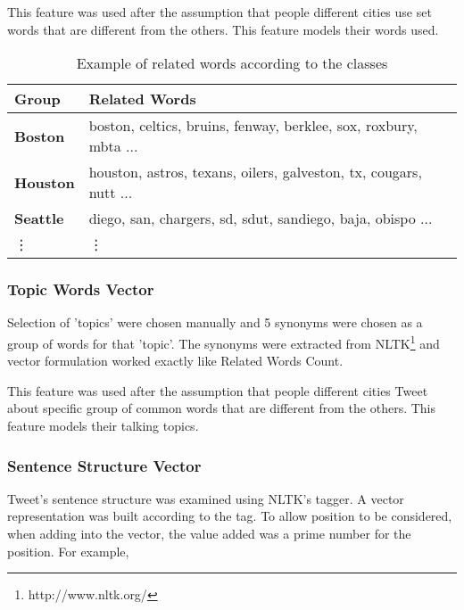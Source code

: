 \documentclass[11pt]{article}
\begin{document}
This feature was used after the assumption that people different cities use set words that are different from the others. This feature models their words used.

\begin{table}[h]
\begin{center}
	\begin{tabular}{|>{\centering\arraybackslash}m{0.6in}|m{2in}|}

      \hline
      \textbf{Group} & \textbf{Related Words}\\
      \hline
      \textbf{Boston} & boston, celtics, bruins, fenway, berklee, sox, roxbury, mbta ...\\
      \hline
      \textbf{Houston} & houston, astros, texans, oilers, galveston, tx, cougars, nutt ... \\
      \hline
      \textbf{Seattle} & diego, san, chargers, sd, sdut, sandiego, baja, obispo ...\\
      \hline
      \vdots & \vdots\\

	\end{tabular}
\caption{Example of related words according to the classes}\label{table1}
\end{center}
\end{table}

\subsubsection{Topic Words Vector}
Selection of 'topics' were chosen manually and 5 synonyms were chosen as a group of words for that 'topic'. The synonyms were extracted from 
NLTK\footnote{http://www.nltk.org/}
and vector formulation worked exactly like Related Words Count.\newline

This feature was used after the assumption that people different cities Tweet about specific group of common words that are different from the others. This feature models their talking topics.

\subsubsection{Sentence Structure Vector}
Tweet's sentence structure was examined using NLTK's tagger.
A vector representation was built according to the tag. To allow position to be considered, when adding into the vector, the value added was a prime number for the position. For example,\newline
\end{document}
